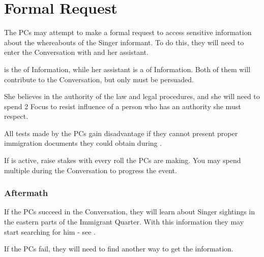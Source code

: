 \section{Formal Request}
\label{sec:formalRequest}

The PCs may attempt to make a formal request to access sensitive information about the whereabouts of the Singer informant. To do this, they will need to enter the Conversation with \npcGhenna{} and her assistant.

\npcGhenna[s] is the \enemyScribeC{} of Information, while her assistant is a \enemyScribeB{} of Information. Both of them will contribute to the Conversation, but only \npcGhenna{} must be persuaded.

She believes in the authority of the law and legal procedures, and she will need to spend 2 Focus to resist influence of a person who has an authority she must respect.

All tests made by the PCs gain disadvantage if they cannot present proper immigration documents they could obtain during . 

If  is active, raise stakes with every roll the PCs are making. You may spend multiple \iconComp{} during the Conversation to progress the event.



\subsubsection{Aftermath}

If the PCs succeed in the Conversation, they will learn about Singer sightings in the eastern parts of the Immigrant Quarter. With this information they may start searching for him - see .

If the PCs fail, they will need to find another way to get the information.

